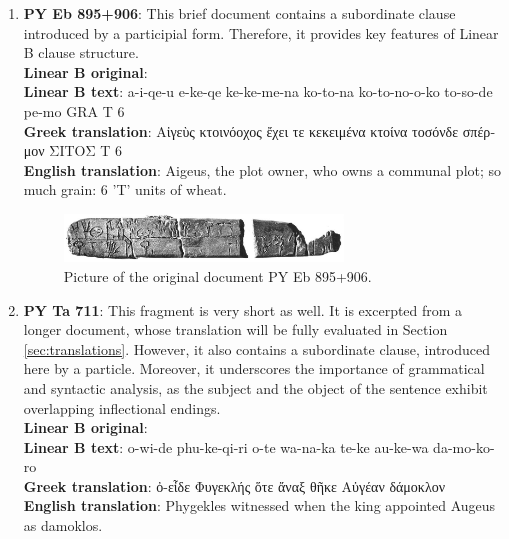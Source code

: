 \begin{enumerate}
  \item \textbf{PY Eb 895+906}: This brief document contains a subordinate clause introduced by a participial form.
  Therefore, it provides key features of Linear B clause structure. \\
  \textbf{Linear B original}: \textlinb{\Ba\Bi\Bqe\Bu} \textlinb{\Be\Bke\Bqe} \textlinb{\Bke\Bke\Bme\Bna} \textlinb{\Bko\Bto\Bna} \textlinb{\Bko\Bto\Bno\Bko} \textlinb{\Bto\Bso\Bde} \textlinb{\Bpe\Bmo} \textlinb{\BPwheat} \textlinb{\BPvolcd} \textlinb{\BNvi}\\
  \textbf{Linear B text}: a-i-qe-u e-ke-qe ke-ke-me-na ko-to-na ko-to-no-o-ko to-so-de pe-mo GRA T 6 \\
  \textbf{Greek translation}: \textgreek{Αἰγεὺς κτοινόοχος ἔχει τε κεκειμένα κτοίνα τοσόνδε σπέρμον ΣΙΤΟΣ Τ 6} \\
  \textbf{English translation}: Aigeus, the plot owner, who owns a communal plot; so much grain: 6 'T' units of wheat. \\
  
  \begin{figure}[H]
    \centering
    \includegraphics[width=0.7\textwidth]{Images/4901.png} %
    \caption{Picture of the original document PY Eb 895+906.}
    \label{fig:example1}
  \end{figure}

  \item \textbf{PY Ta 711}: This fragment is very short as well. It is excerpted from a longer document, whose translation will be fully evaluated in Section \ref{sec:translations}.
  However, it also contains a subordinate clause, introduced here by a particle.
  Moreover, it underscores the importance of grammatical and syntactic analysis, as the subject and the object of the sentence exhibit overlapping inflectional endings. \\
  \textbf{Linear B original}: \textlinb{\Bo\Bwi\Bde} \textlinb{\Bpu\Bke\Bqi\Bri} \textlinb{\Bo\Bte} \textlinb{\Bwa\Bna\Bka} \textlinb{\Bte\Bke} \textlinb{\Bau\Bke\Bwa} \textlinb{\Bda\Bmo\Bko\Bro}\\
  \textbf{Linear B text}: o-wi-de phu-ke-qi-ri o-te wa-na-ka te-ke au-ke-wa da-mo-ko-ro \\
  \textbf{Greek translation}: \textgreek{ὀ-εἶδε Φυγεκλής ὅτε ἄναξ θῆκε Αὐγέαν δάμοκλον} \\
  \textbf{English translation}: Phygekles witnessed when the king appointed Augeus as damoklos. \\


\end{enumerate}

